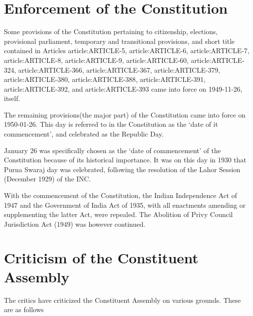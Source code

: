 \begin{multicol}{2}
\section{Enforcement of the Constitution}

Some provisions of the Constitution pertaining to citizenship, elections, provisional parliament, temporary and transitional provisions, and short title contained in Articles \gls{article:ARTICLE-5}, \gls{article:ARTICLE-6}, \gls{article:ARTICLE-7}, \gls{article:ARTICLE-8}, \gls{article:ARTICLE-9}, \gls{article:ARTICLE-60}, \gls{article:ARTICLE-324}, \gls{article:ARTICLE-366}, \gls{article:ARTICLE-367}, \gls{article:ARTICLE-379}, \gls{article:ARTICLE-380}, \gls{article:ARTICLE-388}, \gls{article:ARTICLE-391}, \gls{article:ARTICLE-392}, and \gls{article:ARTICLE-393} came into force on 1949-11-26, itself.

The remaining provisions(the major part) of the Constitution came into force on 1950-01-26. This day is referred to in the Constitution as the `date of it commencement', and celebrated as the Republic Day.

January 26 was specifically chosen as the `date of commencement' of the Constitution because of its historical importance. It was on this day in 1930 that { Purna Swaraj} day was celebrated, following the resolution of the Lahor Session (December 1929) of the INC.

With the commencement of the Constitution, the Indian Independence Act of 1947 and the Government of India Act of 1935, with all enactments amending or supplementing the latter Act, were repealed. The Abolition of Privy Council Jurisdiction Act (1949) was however continued.

\section{Criticism of the Constituent Assembly}

The critics have criticized the Constituent Assembly on various grounds. These are as follows


\end{multicol}
